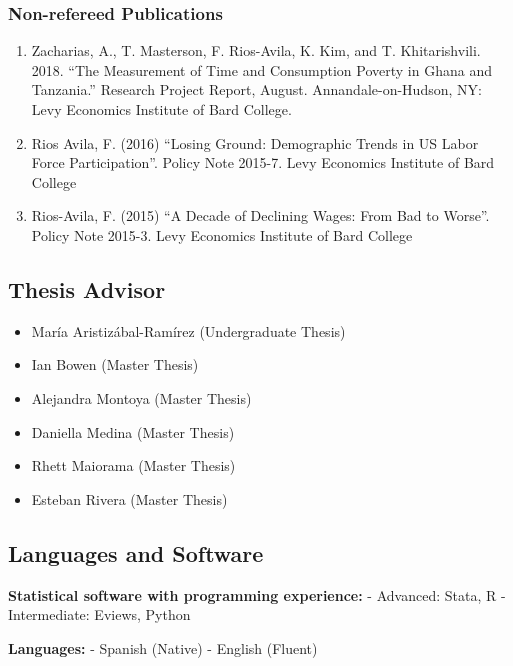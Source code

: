 \documentclass[
  letterpaper,
]{moderncv}
\providecommand{\tightlist}{%
  \setlength{\itemsep}{0pt}\setlength{\parskip}{0pt}}\usepackage{longtable,booktabs,array}
\begin{document}
\subsubsection{Non-refereed
Publications}\label{non-refereed-publications}

\begin{enumerate}
\def\labelenumi{\arabic{enumi}.}
\item
  Zacharias, A., T. Masterson, F. Rios-Avila, K. Kim, and T.
  Khitarishvili. 2018. ``The Measurement of Time and Consumption Poverty
  in Ghana and Tanzania.'' Research Project Report, August.
  Annandale-on-Hudson, NY: Levy Economics Institute of Bard College.
\item
  Rios Avila, F. (2016) ``Losing Ground: Demographic Trends in US Labor
  Force Participation''. Policy Note 2015-7. Levy Economics Institute of
  Bard College
\item
  Rios-Avila, F. (2015) ``A Decade of Declining Wages: From Bad to
  Worse''. Policy Note 2015-3. Levy Economics Institute of Bard College
\end{enumerate}

\subsection{Thesis Advisor}\label{thesis-advisor}

\begin{itemize}
\tightlist
\item
  María Aristizábal-Ramírez (Undergraduate Thesis)
\item
  Ian Bowen (Master Thesis)
\item
  Alejandra Montoya (Master Thesis)
\item
  Daniella Medina (Master Thesis)
\item
  Rhett Maiorama (Master Thesis)
\item
  Esteban Rivera (Master Thesis)
\end{itemize}

\subsection{Languages and Software}\label{languages-and-software}

\textbf{Statistical software with programming experience:} - Advanced:
Stata, R - Intermediate: Eviews, Python

\textbf{Languages:} - Spanish (Native) - English (Fluent)
\end{document}
